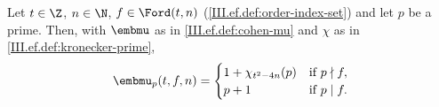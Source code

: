 Let $t\in\Z$, $n\in\N$, $f\in\Ford(t,n)$ (\cref{III.ef.def:order-index-set}) and let $p$ be a prime. Then, with $\embmu$ as in \cref{III.ef.def:cohen-mu}
and $\chi$ as in \cref{III.ef.def:kronecker-prime},
\[
  \embmu_p(t,f,n)=\begin{cases}1+\chi_{t^2-4n}(p)&\text{if }p\nmid f,\\ p+1&\text{if }p\mid f.\end{cases}
\]
